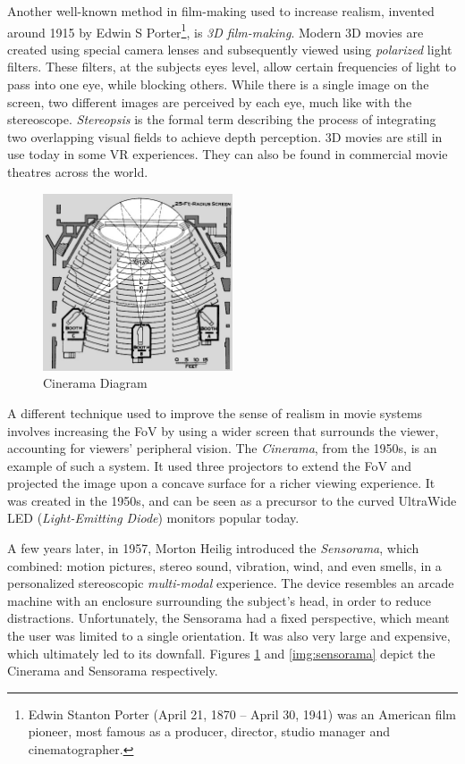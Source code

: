 Another well-known method in film-making used to increase realism, invented around 1915 by Edwin S Porter\footnote{Edwin Stanton Porter (April 21, 1870 – April 30, 1941) was an American film pioneer, most famous as a producer, director, studio manager and cinematographer.}, is \textit{3D film-making}. Modern 3D movies are created using special camera lenses and subsequently viewed using \textit{polarized} light filters. These filters, at the subjects eyes level, allow certain frequencies of light to pass into one eye, while blocking others. While there is a single image on the screen, two different images are perceived by each eye, much like with the stereoscope. \textit{Stereopsis} is the formal term describing the process of integrating two overlapping visual fields to achieve depth perception. 3D movies are still in use today in some VR experiences. They can also be found in commercial movie theatres across the world. 

\begin{figure}[ht!]%
\centering
\includegraphics[width=0.5\textwidth]{img/cinerama.jpg} 
\caption{Cinerama Diagram \cite{FileHowC90online}}
\label{img:cinerama}
\end{figure}

A different technique used to improve the sense of realism in movie systems involves increasing the FoV by using a wider screen that surrounds the viewer, accounting for viewers' peripheral vision. The \textit{Cinerama}, from the 1950s, is an example of such a system. It used three projectors to extend the FoV and projected the image upon a concave surface for a richer viewing experience. It was created in the 1950s, and can be seen as a precursor to the curved UltraWide LED (\textit{Light-Emitting Diode}) monitors popular today. 

A few years later, in 1957, Morton Heilig introduced the \textit{Sensorama}, which combined: motion pictures, stereo sound, vibration, wind, and even smells, in a personalized stereoscopic \textit{multi-modal} experience. The device resembles an arcade machine with an enclosure surrounding the subject's head, in order to reduce distractions. Unfortunately, the Sensorama had a fixed perspective, which meant the user was limited to a single orientation. It was also very large and expensive, which ultimately led to its downfall. Figures \ref{img:cinerama} and \ref{img:sensorama} depict the Cinerama and Sensorama respectively.

